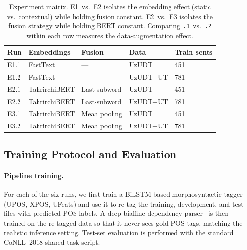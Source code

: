 \documentclass[runningheads]{llncs}
\begin{document}
\begin{table}[t]
\centering
\small
\begin{tabular*}{\textwidth}{@{\extracolsep{\fill}}lllll@{}}
\toprule
\textbf{Run} & \textbf{Embeddings} & \textbf{Fusion} & \textbf{Data} & \textbf{Train sents} \\
\midrule
E1.1 & FastText  & ---           & UzUDT      & 451 \\
E1.2 & FastText  & ---           & UzUDT+UT   & 781 \\
E2.1 & TahrirchiBERT & Last-subword  & UzUDT      & 451 \\
E2.2 & TahrirchiBERT & Last-subword  & UzUDT+UT   & 781 \\
E3.1 & TahrirchiBERT & Mean pooling  & UzUDT      & 451 \\
E3.2 & TahrirchiBERT & Mean pooling  & UzUDT+UT   & 781 \\
\bottomrule
\end{tabular*}
\caption{Experiment matrix.
E1~vs.\ E2 isolates the embedding effect (static vs.\ contextual) while holding fusion constant.
E2~vs.\ E3 isolates the fusion strategy while holding BERT constant.
Comparing \texttt{.1}~vs.\ \texttt{.2} within each row measures the data-augmentation effect.}
\label{tab:matrix}
\end{table}

\subsection{Training Protocol and Evaluation}
\label{sec:training_eval}

\paragraph{Pipeline training.}
For each of the six runs, we first train a BiLSTM-based morphosyntactic tagger (UPOS, XPOS, UFeats) and use it to re-tag the training, development, and test files with predicted POS labels.
A deep biaffine dependency parser~\cite{DBLP:conf/iclr/DozatM17} is then trained on the re-tagged data so that it never sees gold POS tags, matching the realistic inference setting.
Test-set evaluation is performed with the standard CoNLL~2018 shared-task script.
\end{document}
